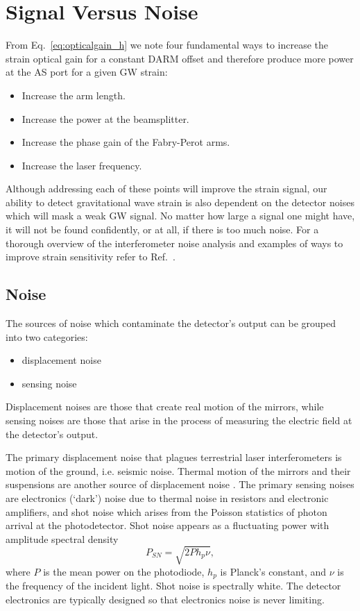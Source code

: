 \section{Signal Versus Noise} 
From Eq.~\ref{eq:opticalgain_h} we note four fundamental ways to
increase the strain optical gain for a constant DARM offset and
therefore produce more power at the AS port for a given GW strain:
\begin{itemize}
\item Increase the arm length. \vspace{-10 pt}
\item Increase the power at the beamsplitter. \vspace{-10 pt}
\item Increase the phase gain of the Fabry-Perot arms. \vspace{-10 pt}
\item Increase the laser frequency.
\end{itemize}
Although addressing each of these points will improve the strain
signal, our ability to detect gravitational wave strain is also
dependent on the detector noises which will mask a weak GW signal. No
matter how large a signal one might have, it will not be found
confidently, or at all, if there is too much noise. For a thorough
overview of the interferometer noise analysis and examples of ways to
improve strain sensitivity refer to Ref.~\cite{RanaThesis}.


\subsection{Noise}
The sources of noise which contaminate the detector's output can be
grouped into two categories:
\begin{itemize}
\item displacement noise \vspace{-10 pt}
\item sensing noise
\end{itemize}
Displacement noises are those that create real motion of the mirrors,
while
sensing noises are those that arise in the process of measuring the
electric field at the detector's output.

The primary displacement noise that plagues terrestrial laser
interferometers is motion of the ground, i.e. seismic noise.  Thermal
motion of the mirrors and their suspensions are another source of
displacement noise \cite{Saulson1990Thermal}. The primary sensing
noises are electronics (`dark') noise due to thermal noise in
resistors and electronic amplifiers, and shot noise which arises from
the Poisson statistics of photon arrival at the photodetector. Shot
noise appears as a fluctuating power with amplitude spectral density
\begin{equation}
P_{SN} = \sqrt{2 P h_p \nu}, %
\label{eq:shotnoise}
\end{equation}
where $P$ is the mean power on the photodiode, $h_p$ is Planck's
constant, and $\nu$ is the frequency of the incident light. Shot noise
is spectrally white.  The detector electronics are typically designed
so that electronics noise is never limiting.


